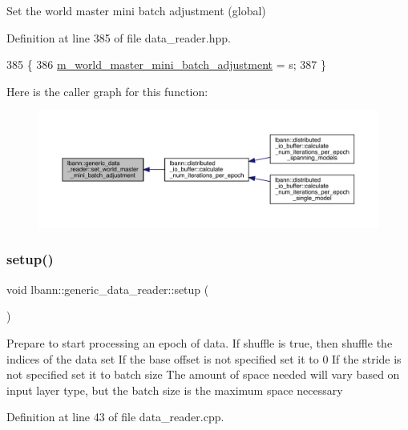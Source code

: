 Set the world master mini batch adjustment (global) 



Definition at line 385 of file data\+\_\+reader.\+hpp.


\begin{DoxyCode}
385                                                            \{
386     \hyperlink{classlbann_1_1generic__data__reader_acd33b2dbdfd4043ecc62cc13789532a2}{m\_world\_master\_mini\_batch\_adjustment} = s;
387   \}
\end{DoxyCode}
Here is the caller graph for this function\+:\nopagebreak
\begin{figure}[H]
\begin{center}
\leavevmode
\includegraphics[width=350pt]{classlbann_1_1generic__data__reader_a208cebb68cf3c1ae1bd9cb5f28e8bf5b_icgraph}
\end{center}
\end{figure}
\mbox{\label{classlbann_1_1generic__data__reader_a879bb7dcb57a0aa1ef9c5039f5b0efda}} 
\subsubsection{\texorpdfstring{setup()}{setup()}}
{\footnotesize\ttfamily void lbann\+::generic\+\_\+data\+\_\+reader\+::setup (\begin{DoxyParamCaption}{ }\end{DoxyParamCaption})}

Prepare to start processing an epoch of data. If shuffle is true, then shuffle the indices of the data set If the base offset is not specified set it to 0 If the stride is not specified set it to batch size The amount of space needed will vary based on input layer type, but the batch size is the maximum space necessary 

Definition at line 43 of file data\+\_\+reader.\+cpp.


